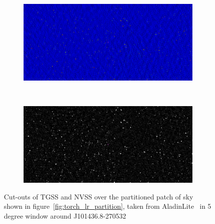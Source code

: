 \documentclass[12pt,a4paper]{article}
\begin{document}
\begin{figure}[H]
    \begin{subfigure}{1\textwidth}
        \centering
        \includegraphics[width=1\linewidth]{pics/tgss_window.pdf}
        \label{fig:tgss_window} 
    \end{subfigure}
    \\
    \begin{subfigure}{1\textwidth}
      \centering
        \includegraphics[width=1\linewidth]{pics/nvss_window.pdf}
        \label{fig:sub-nvss_window}
    \end{subfigure}
    \caption{Cut-outs of TGSS and NVSS over the partitioned patch of sky shown in
    figure~\ref{fig:torch_lr_partition}, taken from AladinLite~\citep{aladinlite} in 5 degree window around  J101436.8-270532}
    \label{fig:tgss-nvss-windows}
\end{figure}
\end{document}

